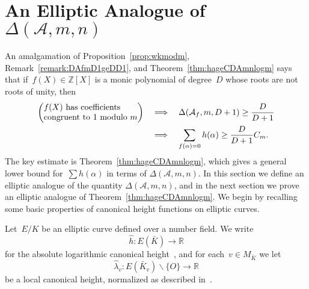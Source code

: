 \section{An Elliptic Analogue of ${\Delta}({{\mathcal A}},m,n)$}
\label{section:ellmodm}

An amalgamation of Proposition~\ref{prop:wkmodm},
Remark~\ref{remark:DAfmD1geDD1}, and Theorem~\ref{thm:hageCDAmnlogm}
says that if~$f(X)\in{\mathbb{Z}}[X]$ is a monic polynomial of degree~$D$ whose
roots are not roots of unity, then
\begin{align*}
  \left(\begin{tabular}{@{}l@{}}
     $f(X)$ has coefficients\\
     congruent to 1 modulo $m$\\
     \end{tabular}\right)
  &\quad\Longrightarrow\quad
     {\Delta}({{\mathcal A}}_f,m,D+1) \ge \frac{D}{D+1} \\
  &\quad\Longrightarrow\quad
     \sum_{f({\alpha})=0} h({\alpha}) \ge \frac{D}{D+1}C_m.
\end{align*}
The key estimate is Theorem~\ref{thm:hageCDAmnlogm}, which gives a
general lower bound for~$\sum h({\alpha})$ in terms of ${\Delta}({{\mathcal A}},m,n)$.
In this section we define an elliptic analogue of the quantity
${\Delta}({{\mathcal A}},m,n)$, and in the next section we prove an 
elliptic analogue of Theorem~\ref{thm:hageCDAmnlogm}.
We begin by recalling some basic properties of canonical height
functions on elliptic curves.

\begin{definition}
Let~$E/K$ be an elliptic curve defined over a number field. We
write
\[
  {{\hat h}} : E({{\bar K}})\longrightarrow {\mathbb{R}}
\]
for the absolute logarithmic canonical height~\cite[VIII~\S9]{MR2514094},
and for each~$v\in M_{{\bar K}}$ we let
\[
  {\hat\lambda}_v : E({{\bar K}}_v){\smallsetminus}\{O\}\longrightarrow{\mathbb{R}}
\]
be a local canonical height, normalized as described
in~\cite[Chapter~VI]{ATAEC}.
\end{definition}

